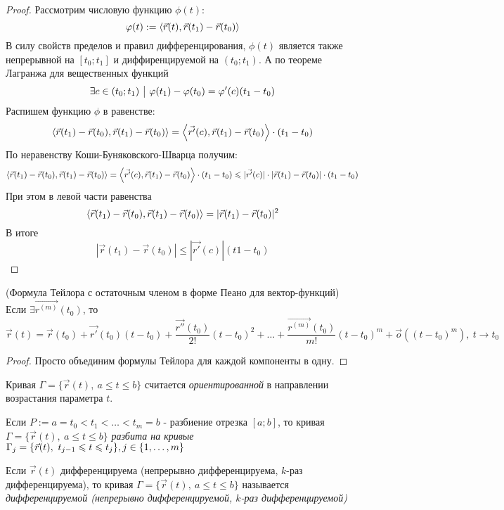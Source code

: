 \begin{proof}
	Рассмотрим числовую функцию $\phi(t)$:
	\[
		\varphi(t) := \left\langle\vec{r}(t), \vec{r}(t_1) - \vec{r}(t_0)\right\rangle
	\]
	В силу свойств пределов и правил дифференцирования, $\phi(t)$ является также непрерывной на $[t_0; t_1]$ и диффиренцируемой на $(t_0; t_1)$. А по теореме Лагранжа для вещественных функций
	\[
		\exists c \in (t_0; t_1) \ \big|\  \varphi(t_1) - \varphi(t_0) = \varphi'(c)(t_1 - t_0)
	\]
	Распишем функцию $\phi$ в равенстве:
	\[
		\left\langle\vec{r}(t_1) - \vec{r}(t_0), \vec{r}(t_1) - \vec{r}(t_0)\right\rangle = \left\langle\vec{r'}(c), \vec{r}(t_1) - \vec{r}(t_0)\right\rangle \cdot (t_1 - t_0)
	\]
	По неравенству Коши-Буняковского-Шварца получим:
	\[
		\left\langle\vec{r}(t_1) - \vec{r}(t_0), \vec{r}(t_1) - \vec{r}(t_0)\right\rangle = \left\langle\vec{r'}(c), \vec{r}(t_1) - \vec{r}(t_0)\right\rangle \cdot (t_1 - t_0) \leqslant |\vec{r'}(c)| \cdot |\vec{r}(t_1) - \vec{r}(t_0)| \cdot (t_1 - t_0)
	\]
	При этом в левой части равенства
	\[
		\left\langle\vec{r}(t_1) - \vec{r}(t_0), \vec{r}(t_1) - \vec{r}(t_0)\right\rangle = |\vec{r}(t_1) - \vec{r}(t_0)|^2
	\]
	В итоге
	\[
		|\vec{r}(t_1) - \vec{r}(t_0)| \le |\vec{r'}(c)|(t1 - t_0)
	\]
\end{proof}

\begin{theorem} (Формула Тейлора с остаточным членом в форме Пеано для вектор-функций)
	Если $\exists \vec{r^{(m)}}(t_0)$, то
	\[
		\vec{r}(t) = \vec{r}(t_0) + \vec{r'}(t_0)(t - t_0) + \frac{\vec{r''}(t_0)}{2!}(t - t_0)^2 + \ldots + \frac{\vec{r^{(m)}}(t_0)}{m!}(t - t_0)^m + \vec{o}\left((t - t_0)^m\right),\ t \to t_0
	\]
\end{theorem}

\begin{proof}
	Просто объединим формулы Тейлора для каждой компоненты в одну.
\end{proof}

\begin{definition}
	Кривая $\Gamma = \{\vec{r}(t),\ a \le t \le b\}$ считается \textit{ориентированной} в направлении возрастания параметра $t$.
\end{definition}

\begin{definition}
	Если $P := a = t_0 < t_1 < \ldots < t_m = b$ - разбиение отрезка $[a; b]$, то кривая $\Gamma = \{\vec{r}(t),\ a \le t \le b\}$ \textit{разбита на кривые} $\Gamma_j = \{\vec{r}(t),\ t_{j - 1} \leqslant t \leqslant t_j\}, j \in \{1, \ldots, m\}$
\end{definition}

\begin{definition}
	Если $\vec{r}(t)$ дифференцируема (непрерывно дифференцируема, $k$-раз дифференцируема), то кривая $\Gamma = \{\vec{r}(t),\ a \le t \le b\}$ называется \textit{дифференцируемой (непрерывно дифференцируемой, $k$-раз дифференцируемой)}
\end{definition}

